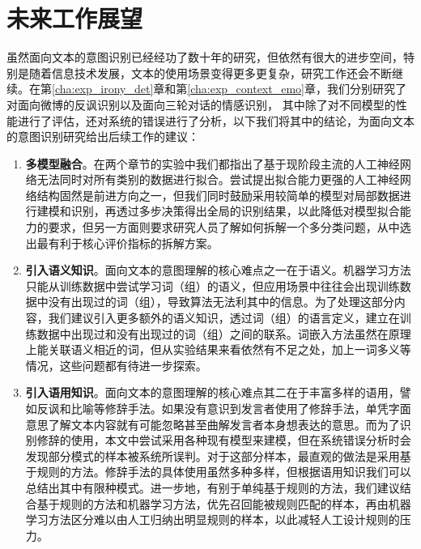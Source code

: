 \section{未来工作展望}

虽然面向文本的意图识别已经经功了数十年的研究，但依然有很大的进步空间，特别是随着信息技术发展，文本的使用场景变得更多更复杂，研究工作还会不断继续。在第\ref{cha:exp_irony_det}章和第\ref{cha:exp_context_emo}章，我们分别研究了对面向微博的反讽识别以及面向三轮对话的情感识别，
其中除了对不同模型的性能进行了评估，还对系统的错误进行了分析，以下我们将其中的结论，为面向文本的意图识别研究给出后续工作的建议：

\begin{enumerate}

\item {\bf 多模型融合}。在两个章节的实验中我们都指出了基于现阶段主流的人工神经网络无法同时对所有类别的数据进行拟合。尝试提出拟合能力更强的人工神经网络结构固然是前进方向之一，但我们同时鼓励采用较简单的模型对局部数据进行建模和识别，再透过多步决策得出全局的识别结果，以此降低对模型拟合能力的要求，但另一方面则要求研究人员了解如何拆解一个多分类问题，从中选出最有利于核心评价指标的拆解方案。

\item {\bf 引入语义知识}。面向文本的意图理解的核心难点之一在于语义。机器学习方法只能从训练数据中尝试学习词（组）的语义，但应用场景中往往会出现训练数据中没有出现过的词（组），导致算法无法利其中的信息。为了处理这部分内容，我们建议引入更多额外的语义知识，透过词（组）的语言定义，建立在训练数据中出现过和没有出现过的词（组）之间的联系。词嵌入方法虽然在原理上能关联语义相近的词，但从实验结果来看依然有不足之处，加上一词多义等情况，这些问题都有待进一步探索。

\item {\bf 引入语用知识}。面向文本的意图理解的核心难点其二在于丰富多样的语用，譬如反讽和比喻等修辞手法。如果没有意识到发言者使用了修辞手法，单凭字面意思了解文本内容就有可能忽略甚至曲解发言者本身想表达的意思。而为了识别修辞的使用，本文中尝试采用各种现有模型来建模，但在系统错误分析时会发现部分模式的样本被系统所误判。对于这部分样本，最直观的做法是采用基于规则的方法。修辞手法的具体使用虽然多种多样，但根据语用知识我们可以总结出其中有限种模式。进一步地，有别于单纯基于规则的方法，我们建议结合基于规则的方法和机器学习方法，优先召回能被规则匹配的样本，再由机器学习方法区分难以由人工归纳出明显规则的样本，以此减轻人工设计规则的压力。


\end{enumerate}







